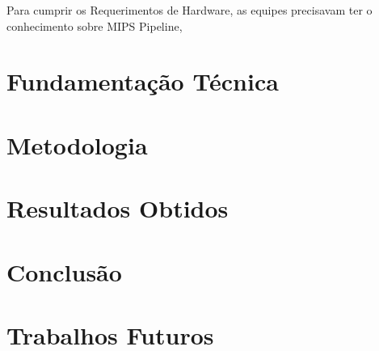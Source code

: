 \documentclass{vgtc}                          %
\begin{document}
Para cumprir os Requerimentos de Hardware, as equipes precisavam ter o conhecimento sobre MIPS Pipeline,  

\section{Fundamentação Técnica}




\section{Metodologia}


\section{Resultados Obtidos}



\section{Conclusão}


\section{Trabalhos Futuros}



\end{document}
